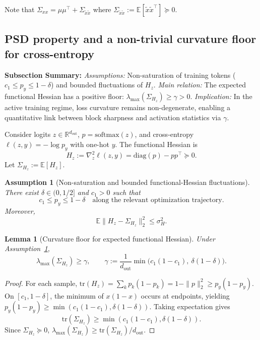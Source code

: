 \documentclass[11pt]{article}
\newtheorem{assumption}{Assumption}
\newtheorem{lemma}{Lemma}
\begin{document}
Note that $\Sigma_{xx}=\mu\mu^\top+\Sigma_{\tilde x\tilde x}$ where $\Sigma_{\tilde x\tilde x}:=\mathbb{E}[\tilde x\tilde x^\top]\succeq 0$.

\subsection{PSD property and a non-trivial curvature floor for cross-entropy}

\textbf{Subsection Summary:}
\textit{Assumptions:} Non-saturation of training tokens ($c_1\le p_y\le 1-\delta$) and bounded fluctuations of $H_z$.
\textit{Main relation:} The expected functional Hessian has a positive floor: $\lambda_{\max}(\Sigma_{H_z})\ge\gamma>0$.
\textit{Implication:} In the active training regime, loss curvature remains non-degenerate, enabling a quantitative link between block sharpness and activation statistics via $\gamma$.

Consider logits $z\in\mathbb{R}^{d_{\mathrm{out}}}$, $p=\mathrm{softmax}(z)$, and cross-entropy $\ell(z,y)=-\log p_y$ with one-hot $y$.
The functional Hessian is
\[
H_z := \nabla_z^2 \ell(z,y)=\mathrm{diag}(p)-pp^\top\succeq 0.
\]
Let $\Sigma_{H_z}:=\mathbb{E}[H_z]$.

\begin{assumption}[Non-saturation and bounded functional-Hessian fluctuations]
\label{assum:nonsaturation}
There exist $\delta\in(0,1/2]$ and $c_1>0$ such that
\[
c_1 \le p_y \le 1-\delta
\quad\text{along the relevant optimization trajectory.}
\]
Moreover,
\[
\mathbb{E}\bigl\|H_z-\Sigma_{H_z}\bigr\|_2^2\le \sigma_H^2.
\]
\end{assumption}

\begin{lemma}[Curvature floor for expected functional Hessian]
\label{lemma:ce_curvature}
Under Assumption~\ref{assum:nonsaturation},
\[
\lambda_{\max}(\Sigma_{H_z}) \ge \gamma,
\qquad
\gamma:=\frac{1}{d_{\mathrm{out}}}\min\bigl(c_1(1-c_1),\ \delta(1-\delta)\bigr).
\]
\end{lemma}
\begin{proof}
For each sample, $\mathrm{tr}(H_z)=\sum_k p_k(1-p_k)=1-\|p\|_2^2\ge p_y(1-p_y)$. On $[c_1,1-\delta]$, the minimum of $x(1-x)$ occurs at endpoints, yielding $p_y(1-p_y)\ge \min(c_1(1-c_1),\delta(1-\delta))$. Taking expectation gives
\[
\mathrm{tr}(\Sigma_{H_z})\ge \min(c_1(1-c_1),\delta(1-\delta)).
\]
Since $\Sigma_{H_z}\succeq 0$, $\lambda_{\max}(\Sigma_{H_z})\ge \mathrm{tr}(\Sigma_{H_z})/d_{\mathrm{out}}$.
\end{proof}
\end{document}

